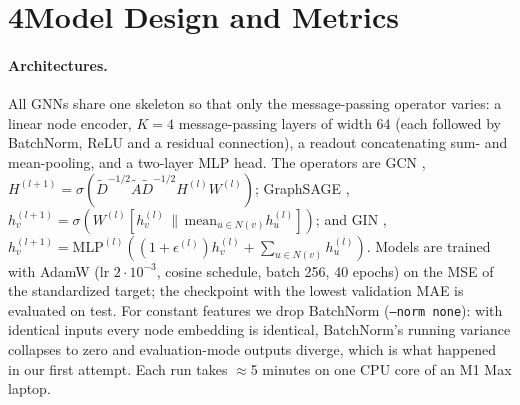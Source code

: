 \documentclass[11pt]{article}
\begin{document}
\section*{4\quad Model Design and Metrics}

\paragraph{Architectures.} All GNNs share one skeleton so that only the message-passing operator
varies: a linear node encoder, $K=4$ message-passing layers of width 64 (each followed by
BatchNorm, ReLU and a residual connection), a readout concatenating sum- and mean-pooling, and a
two-layer MLP head. The operators are GCN \citep{kipf2017gcn},
$H^{(l+1)}=\sigma(\tilde D^{-1/2}\tilde A\tilde D^{-1/2}H^{(l)}W^{(l)})$; GraphSAGE
\citep{hamilton2017sage}, $h_v^{(l+1)}=\sigma(W^{(l)}[h_v^{(l)}\,\|\,\mathrm{mean}_{u\in N(v)}h_u^{(l)}])$;
and GIN \citep{xu2019gin}, $h_v^{(l+1)}=\mathrm{MLP}^{(l)}((1+\epsilon^{(l)})h_v^{(l)}+\sum_{u\in N(v)}h_u^{(l)})$.
Models are trained with AdamW (lr $2\cdot10^{-3}$, cosine schedule, batch 256, 40 epochs) on the
MSE of the standardized target; the checkpoint with the lowest validation MAE is evaluated on
test. For constant features we drop BatchNorm (\texttt{--norm none}): with identical inputs every
node embedding is identical, BatchNorm's running variance collapses to zero and evaluation-mode
outputs diverge, which is what happened in our first attempt. Each run takes $\approx$5 minutes on one CPU core of an M1 Max laptop.
\end{document}
